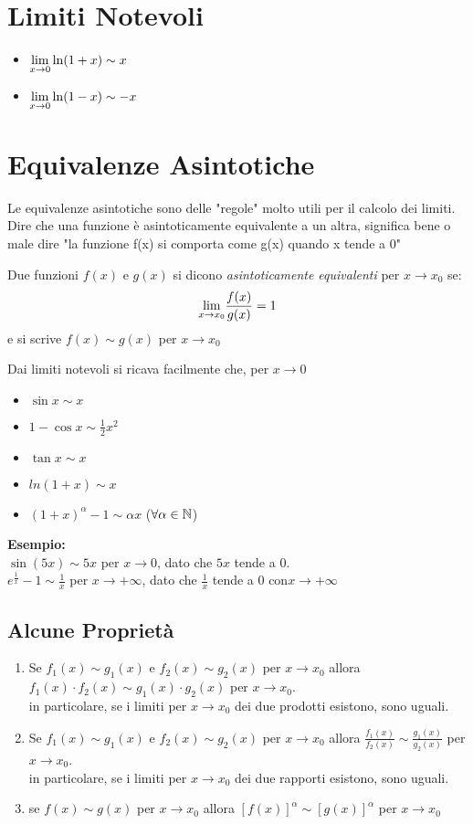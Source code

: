 \documentclass[12pt, a4paper, openany]{book}
\newcommand{\esempio}[1]{\begin{box_esempio} \textbf{Esempio: }#1\end{box_esempio}}
\newcommand{\definizione}[1]{\begin{box_definizione} #1 \end{box_definizione}}
\begin{document}
\section{Limiti Notevoli}
\begin{itemize}
    \item $\underset{x \to 0}{\lim} \ln(1+x) \sim x$
    \item $\underset{x \to 0}{\lim} \ln(1-x) \sim -x$
\end{itemize}
\section{Equivalenze Asintotiche}
Le equivalenze asintotiche sono delle "regole" molto utili per il calcolo dei limiti.
Dire che una funzione è asintoticamente equivalente a un altra, significa bene o male dire "la funzione f(x) si comporta come g(x) quando x tende a 0"

\definizione{
    Due funzioni $f(x)$ e $g(x)$ si dicono \emph{asintoticamente equivalenti} per $x \to x_0$ se:
    $$ \underset{x \to x_0}{\lim} \frac{f(x)}{g(x)} = 1$$
    e si scrive $f(x) \sim g(x)$ per $x\to x_0$
}
Dai limiti notevoli si ricava facilmente che, per $x \to 0$
\begin{itemize}
    \item $\sin x \sim x$
    \item $1 - \cos x \sim \frac{1}{2}x^2$
    \item $\tan x \sim x$
    \item $ln(1+x) \sim x$
    \item $(1+x)^\alpha -1 \sim \alpha x$ ($\forall \alpha \in \mathbb{N}$)
\end{itemize}
\esempio{
    \\$\sin(5x) \sim 5x$ per $x\to 0$, dato che $5x$ tende a 0.
    \\$e^{\frac{1}{x}}-1 \sim \frac{1}{x}$ per $x\to +\infty$, dato che $\frac{1}{x}$ tende a 0 con$x\to +\infty$
}
\subsection*{Alcune Proprietà}
\begin{enumerate}
    \item Se $f_1(x) \sim g_1(x)$ e $f_2(x) \sim g_2(x)$ per $x \to x_0$ allora $f_1(x) \cdot f_2(x) \sim g_1(x) \cdot g_2(x)$ per $x \to x_0$.
    \\in particolare, se i limiti per $x \to x_0$ dei due prodotti esistono, sono uguali.
    \item Se $f_1(x) \sim g_1(x)$ e $f_2(x) \sim g_2(x)$ per $x \to x_0$ allora $\frac{f_1(x)}{f_2(x)} \sim \frac{g_1(x)}{g_2(x)}$ per $x \to x_0$.
    \\in particolare, se i limiti per $x \to x_0$ dei due rapporti esistono, sono uguali.
    \item se $f(x) \sim g(x)$ per $x \to x_0$ allora $[f(x)]^\alpha \sim [g(x)]^\alpha$ per $x \to x_0$
\end{enumerate}
\end{document}
